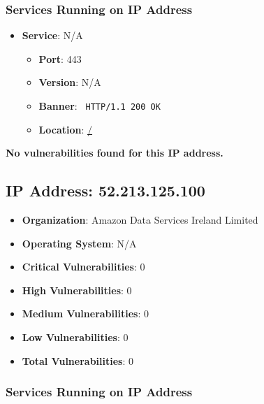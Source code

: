 \documentclass{article}
\begin{document}
\subsubsection*{Services Running on IP Address}

\begin{itemize}
    
        \item \textbf{Service}: N/A
        \begin{itemize}
            \item \textbf{Port}: 443
            \item \textbf{Version}:  N/A 
            \item \textbf{Banner}: \texttt{
                HTTP/1.1 200 OK
            }
            \item \textbf{Location}: \href{ / }{ / }
        \end{itemize}
    
\end{itemize}


\textbf{No vulnerabilities found for this IP address.}




\clearpage



\subsection*{IP Address: 52.213.125.100}

\begin{itemize}
    \item \textbf{Organization}: Amazon Data Services Ireland Limited
    \item \textbf{Operating System}:  N/A 
    \item \textbf{Critical Vulnerabilities}: 0
    \item \textbf{High Vulnerabilities}: 0
    \item \textbf{Medium Vulnerabilities}: 0
    \item \textbf{Low Vulnerabilities}: 0
    \item \textbf{Total Vulnerabilities}: 0
\end{itemize}

\subsubsection*{Services Running on IP Address}
\end{document}

